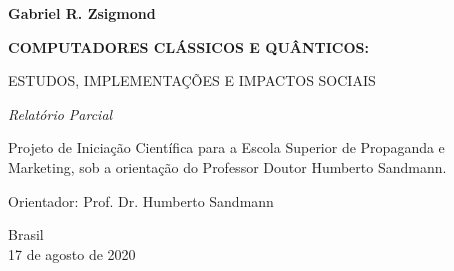 \begin{titlepage}

    \begin{center}
        
        \textbf{Gabriel R. Zsigmond}
        
        \vspace{2cm}
        
        \LARGE
        \textbf{COMPUTADORES CLÁSSICOS E QUÂNTICOS:}
        
        \vspace{0.5cm}
        \large
        ESTUDOS, IMPLEMENTAÇÕES E IMPACTOS SOCIAIS
        
        \vspace{0.5cm}
        
        \Large
        \textit{Relatório Parcial}
        
        \vspace{2cm}
        
        \large
        \begin{flushright}
            \begin{minipage}{10cm}
            Projeto de Iniciação Científica para a Escola Superior de Propaganda e Marketing, sob a orientação do Professor Doutor Humberto Sandmann.\linebreak[3]
            
            Orientador: Prof. Dr. Humberto Sandmann
            \end{minipage}
        \end{flushright}
        \vfill
        
        Brasil\\
        17 de agosto de 2020\\
        
    \end{center}

\end{titlepage}